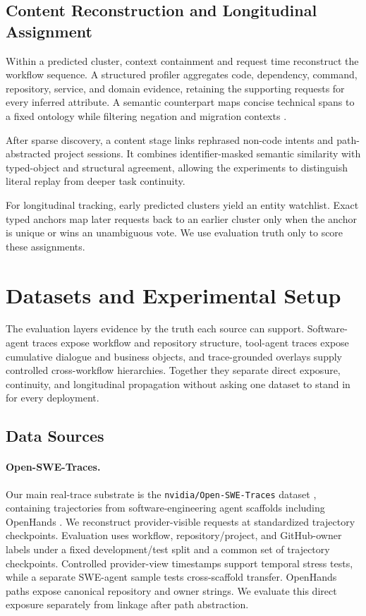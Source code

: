 \documentclass[letterpaper]{article} %
\begin{document}
\subsection{Content Reconstruction and Longitudinal Assignment}

Within a predicted cluster, context containment and request time reconstruct the workflow sequence.
A structured profiler aggregates code, dependency, command, repository, service, and domain
evidence, retaining the supporting requests for every inferred attribute. A semantic counterpart
maps concise technical spans to a fixed ontology while filtering negation and migration contexts
\cite{reimers2019sentencebert,wang2020minilm}.

After sparse discovery, a content stage links rephrased non-code intents and path-abstracted project
sessions. It combines identifier-masked semantic similarity with typed-object and structural
agreement, allowing the experiments to distinguish literal replay from deeper task continuity.

For longitudinal tracking, early predicted clusters yield an entity watchlist. Exact typed anchors
map later requests back to an earlier cluster only when the anchor is unique or wins an
unambiguous vote. We use evaluation truth only to score these assignments.

\section{Datasets and Experimental Setup}

The evaluation layers evidence by the truth each source can support. Software-agent traces expose
workflow and repository structure, tool-agent traces expose cumulative dialogue and business
objects, and trace-grounded overlays supply controlled cross-workflow hierarchies. Together they
separate direct exposure, continuity, and longitudinal propagation without asking one dataset to
stand in for every deployment.

\subsection{Data Sources}

\paragraph{Open-SWE-Traces.}
Our main real-trace substrate is the \texttt{nvidia/Open-SWE-Traces} dataset
\cite{nvidiaopenswetraces}, containing trajectories
from software-engineering agent scaffolds including OpenHands
\cite{wang2024openhands}. We reconstruct provider-visible requests at standardized trajectory
checkpoints.
Evaluation uses workflow, repository/project, and GitHub-owner labels under a fixed development/test
split and a common set of trajectory checkpoints. Controlled provider-view timestamps support
temporal stress tests, while a separate SWE-agent sample tests cross-scaffold transfer.
OpenHands paths expose canonical repository and owner strings. We evaluate this direct exposure
separately from linkage after path abstraction.
\end{document}
